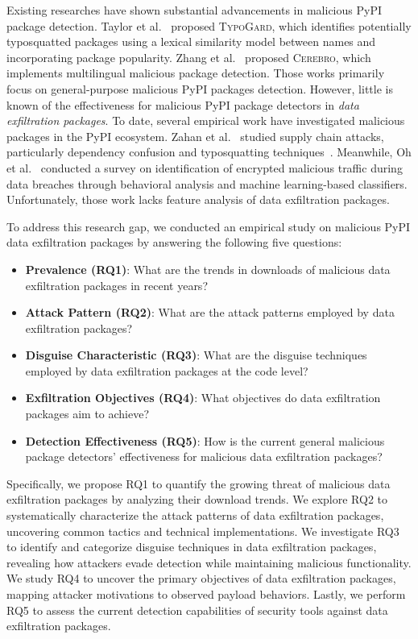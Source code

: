 Existing researches have shown substantial advancements in malicious PyPI package detection.
Taylor et al.~\cite{taylor2020defending} proposed \textsc{TypoGard}, which identifies potentially typosquatted packages using a lexical similarity model between names and incorporating package popularity. 
Zhang et al.~\cite{zhang2025killing} proposed \textsc{Cerebro}, which implements multilingual malicious package detection.
Those works primarily focus on general-purpose malicious PyPI packages detection. However, little is known of the effectiveness for malicious PyPI package detectors in \textit{data exfiltration packages}. To date, several empirical work have investigated malicious packages in the PyPI ecosystem.  
Zahan et al.~\cite{zahan2022weak} studied supply chain attacks, particularly dependency confusion and typosquatting techniques~\cite{vu2020typosquatting}. 
Meanwhile, Oh et al.~\cite{oh2021survey} conducted a survey on identification of encrypted malicious traffic during data breaches through behavioral analysis and machine learning-based classifiers. 
Unfortunately, those work lacks feature analysis of data exfiltration packages.

To address this research gap, we conducted an empirical study on malicious PyPI data exfiltration packages by answering the following five questions:

\begin{itemize}
    \item \textbf{Prevalence (RQ1)}: What are the trends in downloads of malicious data exfiltration packages in recent years?
    \item \textbf{Attack Pattern (RQ2)}: What are the attack patterns employed by data exfiltration packages?
    \item \textbf{Disguise Characteristic (RQ3)}: What are the disguise techniques employed by data exfiltration packages at the code level?
    \item \textbf{Exfiltration Objectives (RQ4)}: What objectives do data exfiltration packages aim to achieve?
    \item \textbf{Detection Effectiveness (RQ5)}: How is the current general malicious package detectors' effectiveness for malicious data exfiltration packages?
\end{itemize}

Specifically, we propose RQ1 to quantify the growing threat of malicious data exfiltration packages by analyzing their download trends. We explore RQ2 to systematically characterize the attack patterns of data exfiltration packages, uncovering common tactics and technical implementations. We investigate RQ3 to identify and categorize disguise techniques in data exfiltration packages, revealing how attackers evade detection while maintaining malicious functionality. We study RQ4 to uncover the primary objectives of data exfiltration packages, mapping attacker motivations to observed payload behaviors. Lastly, we perform RQ5 to assess the current detection capabilities of security tools against data exfiltration packages. 


